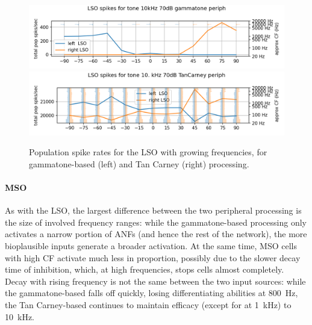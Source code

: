 \documentclass[11pt,a4paper]{article}
\begin{document}
\begin{figure}[H]
    \includegraphics[width=0.4\linewidth]{Images/lso10khz.png}
    \includegraphics[width=0.4\linewidth]{Images/lso10000tc.png}
    \caption{Population spike rates for the LSO with growing frequencies, for gammatone-based (left) and Tan Carney (right) processing.}
    \label{fig:res-lso}
\end{figure}

\paragraph{MSO}
As with the LSO, the largest difference between the two peripheral processing is the size of involved frequency ranges: while the gammatone-based processing only activates a narrow portion of ANFs (and hence the rest of the network), the more bioplausible inputs generate a broader activation. At the same time, MSO cells with high CF activate much less in proportion, possibly due to the slower decay time of inhibition, which, at high frequencies, stops cells almost completely. Decay with rising frequency is not the same between the two input sources: while the gammatone-based falls off quickly, losing differentiating abilities at \qty{800}{\hertz}, the Tan Carney-based continues to maintain efficacy (except for at \qty{1}{\kilo\hertz}) to \qty{10}{\kilo\hertz}.
\end{document}
